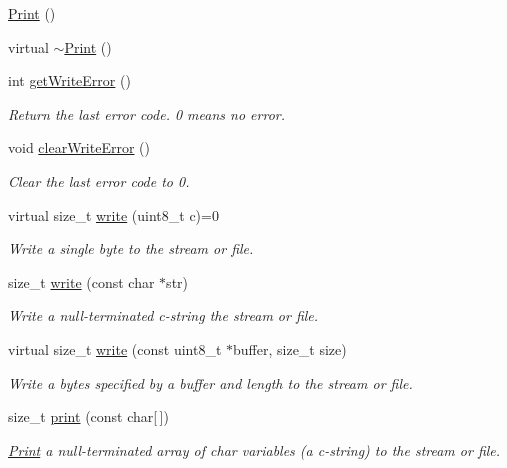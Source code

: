 \begin{DoxyCompactItemize}
\item 
\hyperlink{class_print_a1b9fe938883bb7b4bce8fba012dab112}{Print} ()
\item 
virtual \hyperlink{class_print_abc6ea5fd3d477d9465a57421ccd00ba4}{$\sim$\+Print} ()
\item 
int \hyperlink{class_print_a88a4a829fb5d589efb43955ad0cbddcc}{get\+Write\+Error} ()
\begin{DoxyCompactList}\small\item\em Return the last error code. 0 means no error. \end{DoxyCompactList}\item 
void \hyperlink{class_print_aec9ecf84cc6d9087a650def3cefc459e}{clear\+Write\+Error} ()
\begin{DoxyCompactList}\small\item\em Clear the last error code to 0. \end{DoxyCompactList}\item 
virtual size\+\_\+t \hyperlink{class_print_ab9195b97274029f693aaddce6c7a0021}{write} (uint8\+\_\+t c)=0
\begin{DoxyCompactList}\small\item\em Write a single byte to the stream or file. \end{DoxyCompactList}\item 
size\+\_\+t \hyperlink{class_print_a5b40e0e9cab1f2fe5bb0cb22ffe5adda}{write} (const char $\ast$str)
\begin{DoxyCompactList}\small\item\em Write a null-\/terminated c-\/string the stream or file. \end{DoxyCompactList}\item 
virtual size\+\_\+t \hyperlink{class_print_a88864e109589a5be9b0f5ba1327f8421}{write} (const uint8\+\_\+t $\ast$buffer, size\+\_\+t size)
\begin{DoxyCompactList}\small\item\em Write a bytes specified by a buffer and length to the stream or file. \end{DoxyCompactList}\item 
size\+\_\+t \hyperlink{class_print_acfe80773011eb17dfb52c2fba517a093}{print} (const char\mbox{[}$\,$\mbox{]})
\begin{DoxyCompactList}\small\item\em \hyperlink{class_print}{Print} a null-\/terminated array of char variables (a c-\/string) to the stream or file. \end{DoxyCompactList}\item 

\end{DoxyCompactItemize}
